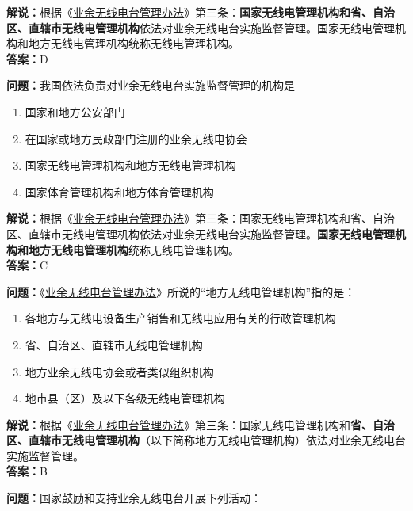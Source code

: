 \textbf{解说：}根据《\href{https://www.miit.gov.cn/jgsj/zfs/bmgz/art/2020/art_147b69815b3641caad9047735f94c860.html}{业余无线电台管理办法}》第三条：\textbf{国家无线电管理机构和省、自治区、直辖市无线电管理机构}依法对业余无线电台实施监督管理。国家无线电管理机构和地方无线电管理机构统称无线电管理机构。\\\textbf{答案：}D


\textbf{问题：}我国依法负责对业余无线电台实施监督管理的机构是

\begin{enumerate}[label=\Alph*), leftmargin=1.5cm]
	\item 国家和地方公安部门
	\item 在国家或地方民政部门注册的业余无线电协会
	\item 国家无线电管理机构和地方无线电管理机构
	\item 国家体育管理机构和地方体育管理机构
\end{enumerate}

\textbf{解说：}根据《\href{https://www.miit.gov.cn/jgsj/zfs/bmgz/art/2020/art_147b69815b3641caad9047735f94c860.html}{业余无线电台管理办法}》第三条：国家无线电管理机构和省、自治区、直辖市无线电管理机构依法对业余无线电台实施监督管理。\textbf{国家无线电管理机构和地方无线电管理机构}统称无线电管理机构。\\\textbf{答案：}C


\textbf{问题：}《\href{https://www.miit.gov.cn/jgsj/zfs/bmgz/art/2020/art_147b69815b3641caad9047735f94c860.html}{业余无线电台管理办法}》所说的“地方无线电管理机构”指的是：

\begin{enumerate}[label=\Alph*), leftmargin=1.5cm]
	\item 各地方与无线电设备生产销售和无线电应用有关的行政管理机构
	\item 省、自治区、直辖市无线电管理机构
	\item 地方业余无线电协会或者类似组织机构
	\item 地市县（区）及以下各级无线电管理机构
\end{enumerate}

\textbf{解说：}根据《\href{https://www.miit.gov.cn/jgsj/zfs/bmgz/art/2020/art_147b69815b3641caad9047735f94c860.html}{业余无线电台管理办法}》第三条：国家无线电管理机构和\textbf{省、自治区、直辖市无线电管理机构}（以下简称地方无线电管理机构）依法对业余无线电台实施监督管理。\\\textbf{答案：}B


\textbf{问题：}国家鼓励和支持业余无线电台开展下列活动：

